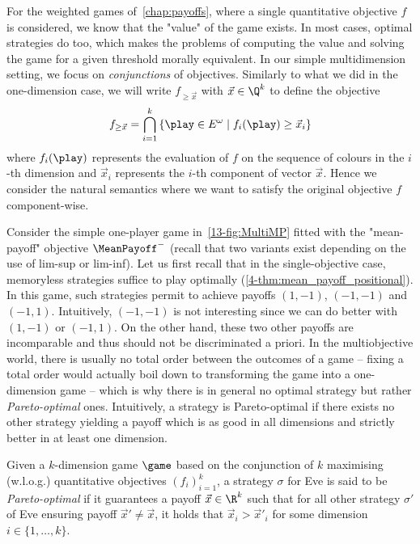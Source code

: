 For the weighted games of~\cref{chap:payoffs}, where a single quantitative objective $f$ is considered, we know that the "value" of the game exists. In most cases, optimal strategies do too, which makes the problems of computing the value and solving the game for a given threshold morally equivalent. In our simple multidimension setting, we focus on \emph{conjunctions} of objectives. Similarly to what we did in the one-dimension case, we will write $f_{\geq \vec{x}}$ with $\vec{x} \in \Q^k$ to define the objective
\[
f_{\geq \vec{x}} = \bigcap_{i = 1}^{k} \left\lbrace \play \in E^\omega \mid f_i(\play) \geq \vec{x}_i\right\rbrace 
\]
where $f_i(\play)$ represents the evaluation of $f$ on the sequence of colours in the $i$-th dimension and $\vec{x}_i$ represents the $i$-th component of vector $\vec{x}$. Hence we consider the natural semantics where we want to satisfy the original objective $f$ component-wise.

\begin{example}
\label{13-ex:MMP}
Consider the simple one-player game in~\cref{13-fig:MultiMP} fitted with the "mean-payoff" objective $\MeanPayoff^-$  (recall that two variants exist depending on the use of lim-sup or lim-inf).  Let us first recall that in the single-objective case, memoryless strategies suffice to play optimally (\cref{4-thm:mean_payoff_positional}). In this game, such strategies permit to achieve payoffs $(1,-1)$, $(-1,-1)$ and $(-1,1)$. Intuitively, $(-1,-1)$ is not interesting since we can do better with $(1,-1)$ or $(-1,1)$. On the other hand, these two other payoffs are incomparable and thus should not be discriminated a priori. In the multiobjective world, there is usually no total order between the outcomes of a game -- fixing a total order would actually boil down to transforming the game into a one-dimension game -- which is why there is in general no optimal strategy but rather \emph{Pareto-optimal} ones. Intuitively, a strategy is Pareto-optimal if there exists no other strategy yielding a payoff which is as good in all dimensions and strictly better in at least one dimension.
\end{example}

\begin{definition}
Given a $k$-dimension game $\game$ based on the conjunction of $k$ maximising (w.l.o.g.) quantitative objectives $(f_i)_{i=1}^{k}$, a strategy $\sigma$ for Eve is said to be \emph{Pareto-optimal} if it guarantees a payoff $\vec{x} \in \R^k$ such that for all other strategy $\sigma'$ of Eve ensuring payoff $\vec{x}' \neq \vec{x}$, it holds that $\vec{x}_i > \vec{x}'_i$ for some dimension $i \in \{1, \ldots, k\}$.
\end{definition}
 
